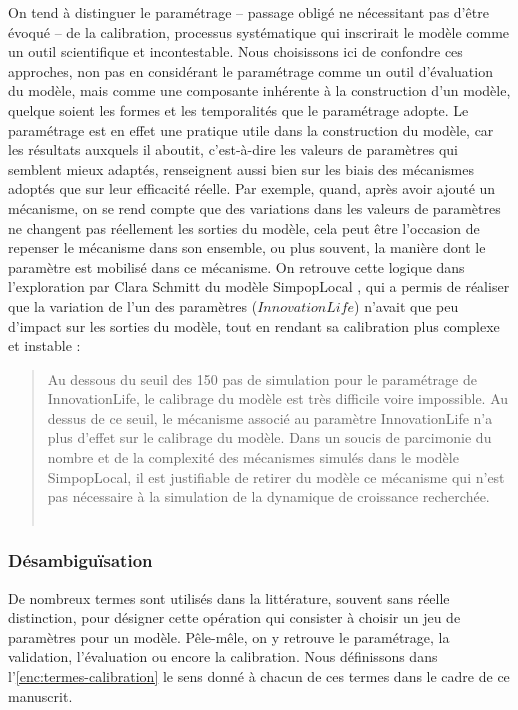 On tend à distinguer le paramétrage -- passage obligé ne nécessitant pas d'être évoqué -- de la calibration, processus systématique qui inscrirait le modèle comme un outil scientifique et incontestable.
Nous choisissons ici de confondre ces approches, non pas en considérant le paramétrage comme un outil d'évaluation du modèle, mais comme une composante inhérente à la construction d'un modèle, quelque soient les formes et les temporalités que le paramétrage adopte.
Le paramétrage est en effet une pratique utile dans la construction du modèle, car les résultats auxquels il aboutit, c'est-à-dire les valeurs de paramètres qui semblent mieux adaptés, renseignent aussi bien sur les biais des mécanismes adoptés que sur leur efficacité réelle.
Par exemple, quand, après avoir ajouté un mécanisme, on se rend compte que des variations dans les valeurs de paramètres ne changent pas réellement les sorties du modèle, cela peut être l'occasion de repenser le mécanisme dans son ensemble, ou plus souvent, la manière dont le paramètre est mobilisé dans ce mécanisme. On retrouve cette logique dans l'exploration par Clara Schmitt du modèle SimpopLocal \autocite{schmitt_modelisation_2014}, qui a permis de réaliser que la variation de l'un des paramètres ($InnovationLife$) n'avait que peu d'impact sur les sorties du modèle, tout en rendant sa calibration plus complexe et instable :
\begin{quote}
	Au dessous du seuil des 150 pas de simulation pour le paramétrage de InnovationLife, le calibrage du modèle est très difficile voire impossible. Au dessus de ce seuil, le mécanisme associé au paramètre InnovationLife n’a plus d’effet sur le calibrage du modèle. Dans un soucis de parcimonie du nombre et de la complexité des mécanismes simulés dans le modèle SimpopLocal, il est justifiable de retirer du modèle ce mécanisme qui n’est pas nécessaire à la simulation de la dynamique de croissance recherchée.\\
	\mbox{}~ \hfill \autocite[224]{schmitt_modelisation_2014}
\end{quote}

\subsubsection{Désambiguïsation}

De nombreux termes sont utilisés dans la littérature, souvent sans réelle distinction, pour désigner cette opération qui consister à choisir un jeu de paramètres pour un modèle.
Pêle-mêle, on y retrouve le paramétrage, la validation, l'évaluation ou encore la calibration.
Nous définissons dans l'\cref{enc:termes-calibration} le sens donné à chacun de ces termes dans le cadre de ce manuscrit.
\bigskip

